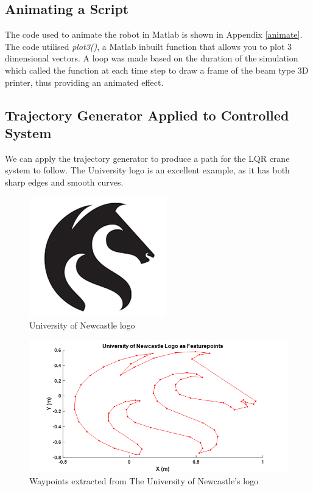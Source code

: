\documentclass{UoNMCHA}
\numberwithin{equation}{section}
\begin{document}
	\subsection{Animating a Script}
	
	The code used to animate the robot in Matlab is shown in Appendix \ref{animate}. The code utilised \textit{plot3()}, a Matlab inbuilt function that allows you to plot 3 dimensional vectors. A loop was made based on the duration of the simulation which called the function at each time step to draw a frame of the beam type 3D printer, thus providing an animated effect.
	
	\newpage
	\subsection{Trajectory Generator Applied to Controlled System}
	
	We can apply the trajectory generator to produce a path for the LQR crane system to follow. The University logo is an excellent example, as it has both sharp edges and smooth curves. 
	
	
	\begin{figure}[H]
		\begin{center}
			\includegraphics[width=.5\linewidth]{figs/Picture21}
			\caption{University of Newcastle logo}
			\label{figs/Picture21}
		\end{center}
	\end{figure}
	
	
	\begin{figure}[H]
		\begin{center}
			\includegraphics[width=.8\linewidth]{figs/Picture22}
			\caption{Waypoints extracted from The University of Newcastle's logo}
			\label{figs/Picture22}
		\end{center}
	\end{figure}
	
\end{document}

